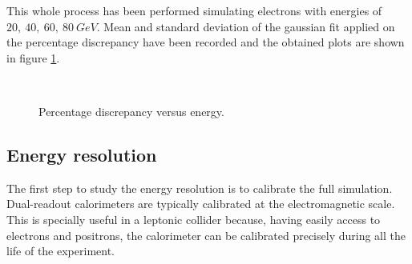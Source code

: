 This whole process has been performed simulating electrons with energies of $20,\ 40,\ 60,\ 80\ GeV$. Mean and standard deviation of the gaussian fit applied on the percentage discrepancy have been recorded and the obtained plots are shown in figure \ref{fig:sat_vs_E}.\\

\begin{figure}
	\centering
	 \\
	\caption{Percentage discrepancy versus energy.}
	\label{fig:sat_vs_E}
\end{figure}

\subsection{Energy resolution} \label{subsec:E_res}
The first step to study the energy resolution is to calibrate the full simulation.\\
Dual-readout calorimeters are typically calibrated at the electromagnetic scale. This is specially useful in a leptonic collider because, having easily access to electrons and positrons, the calorimeter can be calibrated precisely during all the life of the experiment.\\

